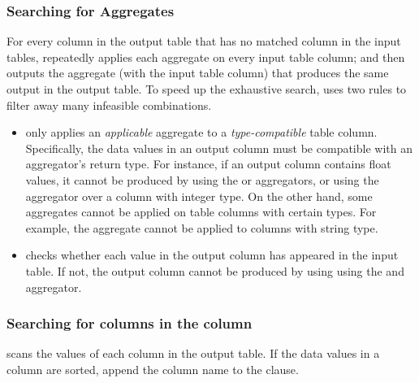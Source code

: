 





\subsubsection{Searching for Aggregates}
\label{sec:agg_search}

For every column in the output table that has no matched
column in the input tables,
\ourtool repeatedly applies each aggregate on
every input table column; and then outputs the aggregate (with the
input table column) that produces the same output 
in the output table. To speed up the exhaustive search,
\ourtool uses two rules to filter away many infeasible
combinations.


\begin{itemize}
\item \ourtool only applies an \textit{applicable} aggregate
to a \textit{type-compatible} table column. Specifically,
the data values in an output column must be compatible with an
aggregator's return type. For instance, if an output column
contains float values, it cannot be produced by using the 
or  aggregators, or 
using the  aggregator over a column with integer type.
On the other hand, some aggregates cannot be applied on
table columns with certain types. For example, the 
aggregate cannot be applied to columns with string type.

\item \ourtool checks whether each value in the output
column has appeared in the input table. If not, the
output column cannot be produced by using
using the  and  aggregator.
\end{itemize}


\subsubsection{Searching for columns in the  column}
\label{sec:orderby}
\ourtool scans the values of each column in the output table. If
the data values in a column are sorted, \ourtool
append the column name to the  clause.
